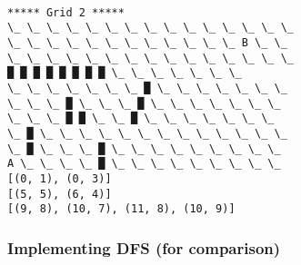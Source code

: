 \documentclass[11pt]{article}
\begin{document}
    \begin{Verbatim}[commandchars=\\\{\}]

***** Grid 2 *****
\_ \_ \_ \_ \_ \_ \_ \_ \_ \_ \_ \_ \_ \_ \_
\_ \_ \_ \_ \_ \_ \_ \_ \_ \_ \_ \_ B \_ \_
\_ \_ \_ \_ \_ \_ \_ \_ \_ \_ \_ \_ \_ \_ \_
█ █ █ █ █ █ █ █ \_ \_ \_ \_ \_ \_ \_
\_ \_ \_ \_ \_ \_ \_ █ \_ \_ \_ \_ \_ \_ \_
\_ \_ \_ █ \_ \_ \_ █ \_ \_ \_ \_ \_ \_ \_
\_ \_ \_ █ █ \_ \_ █ \_ \_ \_ \_ \_ \_ \_
\_ █ \_ \_ \_ \_ \_ \_ \_ \_ \_ \_ \_ \_ \_
\_ █ \_ \_ \_ █ \_ \_ \_ \_ \_ \_ \_ \_ \_
A \_ \_ \_ \_ █ \_ \_ \_ \_ \_ \_ \_ \_ \_
[(0, 1), (0, 3)]
[(5, 5), (6, 4)]
[(9, 8), (10, 7), (11, 8), (10, 9)]

    \end{Verbatim}

    \hypertarget{implementing-dfs-for-comparison}{%
\subsubsection{Implementing DFS (for
comparison)}\label{implementing-dfs-for-comparison}}
\end{document}
